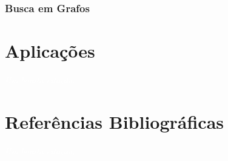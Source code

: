 \documentclass[11pt,fleqn]{book} %
\begin{document}
\subsection{Busca em Grafos}

\chapter{Aplicações}\label{aplicacoes}
\vspace{6em}
\begin{flushright}
	\textit{\textcolor{white}{Um bonita citação...}}
\end{flushright}
\vspace{12em}



%

\chapter*{Referências Bibliográficas}\label{referencias}
\vspace{6em}
\begin{flushright}
	\textit{\textcolor{white}{Um bonita citação...}}
\end{flushright}
\vspace{12em}
\printbibliography[heading=bibempty]
\end{document}
